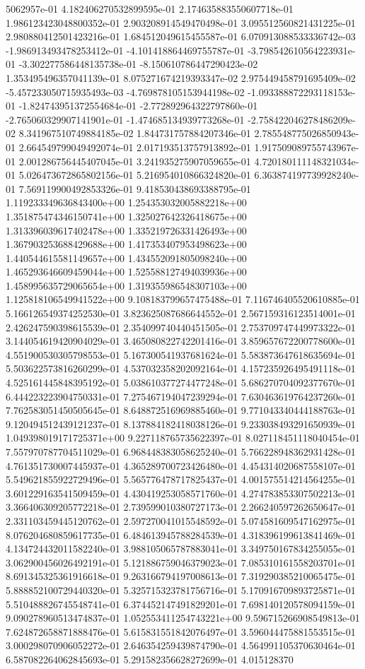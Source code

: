 5062957e-01	4.182406270532899595e-01	2.174635883550607718e-01	1.986123423048800352e-01	2.903208914549470498e-01	3.095512560821431225e-01	2.980880412501423216e-01	1.684512049615455587e-01	6.070913088533336742e-03	-1.986913493478253412e-01	-4.101418864469755787e-01	-3.798542610564223931e-01	-3.302277586448135738e-01	-8.150610786447290423e-02	1.353495496357041139e-01	8.075271674219393347e-02	2.975449458791695409e-02	-5.457233050715935493e-03	-4.769878105153944198e-02	-1.093388872293118153e-01	-1.824743951372554684e-01	-2.772892964322797860e-01	-2.765060329907141901e-01	-1.474685134939773268e-01	-2.758422046278486209e-02	8.341967510749884185e-02	1.844731757884207346e-01	2.785548775026850943e-01	2.664549799049492074e-01	2.017193513757913892e-01	1.917509089755743967e-01	2.001286756445407045e-01	3.241935275907059655e-01	4.720180111148321034e-01	5.026473672865802156e-01	5.216954010866324820e-01	6.363874197739928240e-01	7.569119900492853326e-01	9.418530438693388795e-01	1.119233349636843400e+00	1.254353032005882218e+00	1.351875474346150741e+00	1.325027642326418675e+00	1.313396039617402478e+00	1.335219726331426493e+00	1.367903253688429688e+00	1.417353407953498623e+00	1.440544615581149657e+00	1.434552091805098240e+00	1.465293646609459044e+00	1.525588127494039936e+00	1.458995635729065654e+00	1.319355986548307103e+00	1.125818106549941522e+00	9.108183799657475488e-01	7.116746405520610885e-01	5.166126549374252530e-01	3.823625087686644552e-01	2.567159316123514001e-01	2.426247590398615539e-01	2.354099740440451505e-01	2.753709747449973322e-01	3.144054619420904029e-01	3.465080822742201416e-01	3.859657672200778600e-01	4.551900530305798553e-01	5.167300541937681624e-01	5.583873647618635694e-01	5.503622573816260299e-01	4.537032358202092164e-01	4.157235926495491118e-01	4.525161445848395192e-01	5.038610377274477248e-01	5.686270704092377670e-01	6.444223223904750331e-01	7.275467194047239294e-01	7.630463619764237260e-01	7.762583051450505645e-01	8.648872516969885460e-01	9.771043340444188763e-01	9.120494512439121237e-01	8.137884182418038126e-01	9.233038493291650939e-01	1.049398019171725371e+00	9.227118765735622397e-01	8.027118451118040454e-01	7.557970787704511029e-01	6.968448383058625240e-01	5.766228948362931428e-01	4.761351730007445937e-01	4.365289700723426480e-01	4.454314020687558107e-01	5.549621855922729496e-01	5.565776478717825437e-01	4.001575514214564255e-01	3.601229163541509459e-01	4.430419253058571760e-01	4.274783853307502213e-01	3.366406309205772218e-01	2.739599010380727173e-01	2.266240597262650647e-01	2.331103459445120762e-01	2.597270041015548592e-01	5.074581609547162975e-01	8.076204680859617735e-01	6.484613945788284539e-01	4.318396199613841469e-01	4.134724432011582240e-01	3.988105065787883041e-01	3.349750167834255055e-01	3.062900456026492191e-01	5.121886759046379023e-01	7.085310161558203701e-01	8.691345325361916618e-01	9.263166794197008613e-01	7.319290385210065475e-01	5.888852100729440320e-01	5.325715323781756716e-01	5.170916709893725871e-01	5.510488826745548741e-01	6.374452147491829201e-01	7.698140120578094159e-01	9.090278960513474837e-01	1.052553411254743221e+00	9.596715266908549813e-01	7.624872658871888476e-01	5.615831551842076497e-01	3.596044475881553515e-01	3.000298070906052272e-01	2.646354259439874790e-01	4.564991105370630464e-01	6.587082264062845693e-01	5.291582356628272699e-01	4.015128370